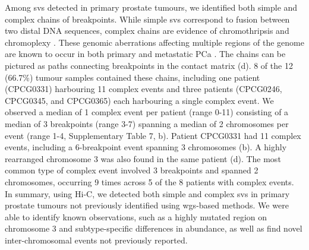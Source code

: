 
Among \glspl{sv} detected in primary prostate tumours, we identified both simple and complex chains of breakpoints.
While simple \glspl{sv} correspond to fusion between two distal DNA sequences, complex chains are evidence of chromothripsis and chromoplexy \cite{bacaPunctuatedEvolutionProstate2013}.
These genomic aberrations affecting multiple regions of the genome are known to occur in both primary and metastatic PCa \cite{bacaPunctuatedEvolutionProstate2013,fraserGenomicHallmarksLocalized2017,liPatternsSomaticStructural2020}.
The chains can be pictured as paths connecting breakpoints in the contact matrix (d).
8 of the 12 (66.7\%) tumour samples contained these chains, including one patient (CPCG0331) harbouring 11 complex events and three patients (CPCG0246, CPCG0345, and CPCG0365) each harbouring a single complex event.
We observed a median of 1 complex event per patient (range 0-11) consisting of a median of 3 breakpoints (range 3-7) spanning a median of 2 chromosomes per event (range 1-4, Supplementary Table 7, b).
Patient CPCG0331 had 11 complex events, including a 6-breakpoint event spanning 3 chromosomes (b).
A highly rearranged chromosome 3 was also found in the same patient (d).
The most common type of complex event involved 3 breakpoints and spanned 2 chromosomes, occurring 9 times across 5 of the 8 patients with complex events.
In summary, using Hi-C, we detected both simple and complex \glspl{sv} in primary prostate tumours not previously identified using \gls{wgs}-based methods.
We were able to identify known observations, such as a highly mutated region on chromosome 3 and subtype-specific differences in abundance, as well as find novel inter-chromosomal events not previously reported.


